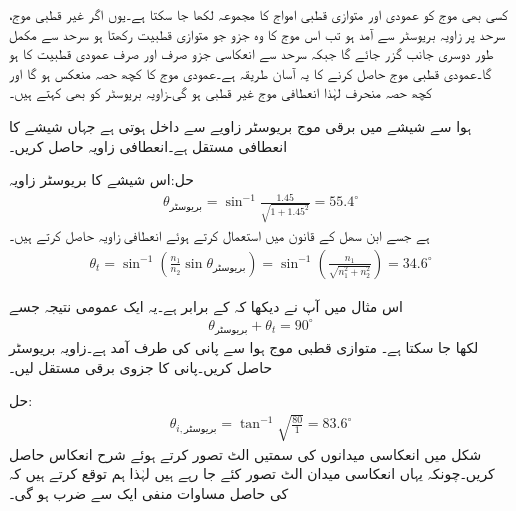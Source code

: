 کسی بھی موج کو عمودی اور متوازی قطبی امواج کا مجموعہ لکھا جا سکتا ہے۔یوں اگر غیر قطبی موج، سرحد پر  زاویہ بریوسٹر سے آمد ہو تب اس موج کا وہ جزو جو متوازی قطبیت رکھتا ہو سرحد سے مکمل طور دوسری جانب گزر جائے گا جبکہ سرحد سے انعکاسی جزو صرف اور صرف عمودی قطبیت کا ہو گا۔عمودی قطبی موج حاصل کرنے کا یہ آسان طریقہ ہے۔عمودی موج کا کچھ حصہ منعکس ہو گا اور کچھ حصہ منحرف لہٰذا انعطافی موج غیر قطبی ہو گی۔زاویہ بریوسٹر کو  بھی کہتے ہیں۔  

ہوا سے شیشے  میں برقی موج بریوسٹر زاویے سے داخل ہوتی ہے جہاں شیشے کا انعطافی مستقل  ہے۔انعطافی زاویہ حاصل کریں۔

حل:اس شیشے کا بریوسٹر زاویہ
\begin{align*}
\theta_{\text{بریوسٹر}} = \sin^{-1} \frac{1.45}{\sqrt{1+1.45^2}}=55.4^{\circ}
\end{align*}
ہے جسے ابن سھل کے قانون میں استعمال کرتے ہوئے انعطافی زاویہ حاصل کرتے ہیں۔
\begin{align*}
\theta_t=\sin^{-1} \left(\frac{n_1}{n_2} \sin \theta_{\text{بریوسٹر}} \right)=\sin^{-1} \left(\frac{n_1}{\sqrt{n_1^2+n_2^2}}\right)=34.6^{\circ}
\end{align*}

اس مثال میں آپ نے دیکھا کہ  کے برابر ہے۔یہ ایک عمومی نتیجہ جسے
\begin{align}
\theta_{\text{بریوسٹر}} +\theta_{t}=90^{\circ}
\end{align}
لکھا جا سکتا ہے۔
متوازی قطبی موج ہوا سے پانی کی طرف آمد ہے۔زاویہ بریوسٹر حاصل کریں۔پانی کا جزوی برقی مستقل  لیں۔

حل:
\begin{align}
\theta_{i,\text{بریوسٹر}} =\tan^{-1} \sqrt{\frac{80}{1}}=83.6^{\circ}
\end{align} 
شکل  میں انعکاسی میدانوں کی سمتیں الٹ تصور کرتے ہوئے شرح انعکاس  حاصل کریں۔چونکہ یہاں انعکاسی میدان الٹ تصور کئے جا رہے ہیں لہٰذا ہم توقع کرتے ہیں کہ  کی حاصل مساوات منفی ایک سے ضرب ہو گی۔

